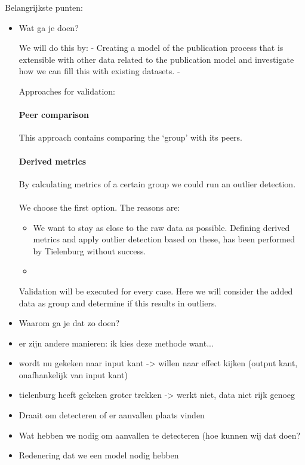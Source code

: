 \documentclass{ou-report}
\newcommand{\outline}[1]{{\color{blue} #1}}
\begin{document}
\outline{
Belangrijkste punten:
\begin{itemize}
    \item Wat ga je doen?
    
    We will do this by:
    - Creating a model of the publication process that is extensible with other data related to the publication model and investigate how we can fill this with existing datasets.
    - 
    
    
    Approaches for validation:
    \paragraph{Peer comparison} This approach contains comparing the `group' with its peers.
    
    \paragraph{Derived metrics} By calculating metrics of a certain group we could run an outlier detection.
    
    \paragraph{} We choose the first option. The reasons are:
    \begin{itemize}
        \item We want to stay as close to the raw data as possible. Defining derived metrics and apply outlier detection based on these, has been performed by Tielenburg without success.
        \item 
    \end{itemize}
    
    Validation will be executed for every case. Here we will consider the added
    data as group and determine if this results in outliers.

    
    \item Waarom ga je dat zo doen?
    \item er zijn andere manieren: ik kies deze methode want...
    \item wordt nu gekeken naar input kant -> willen naar effect kijken (output kant, onafhankelijk van input kant)
    \item tielenburg heeft gekeken groter trekken -> werkt niet, data niet rijk genoeg
    \item Draait om detecteren of er aanvallen plaats vinden
    \item Wat hebben we nodig om aanvallen te detecteren (hoe kunnen wij dat 
    doen?
    \item Redenering dat we een model nodig hebben
\end{itemize}
}
\end{document}
